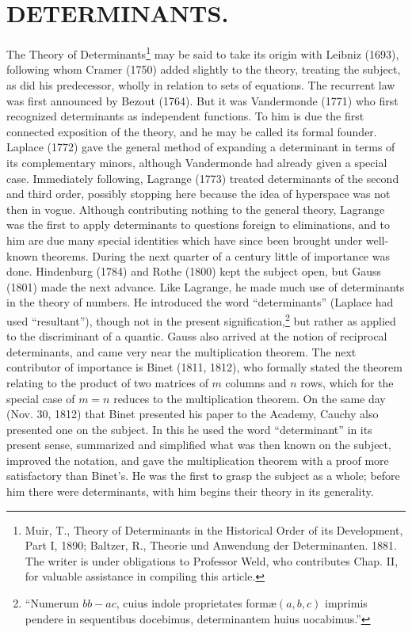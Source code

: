 \documentclass[oneside]{book}
\begin{document}
\chapter{DETERMINANTS.}

The Theory of Determinants\footnote{Muir, T., Theory of Determinants
in the Historical Order of its Development, Part I, 1890; Baltzer,
R., Theorie und Anwendung der Determinanten. 1881. The writer is
under obligations to Professor Weld, who contributes Chap. II, for
valuable assistance in compiling this article.} may be said to take
its origin with Leibniz (1693), following whom Cramer (1750) added
slightly to the theory, treating the subject, as did his
predecessor, wholly in relation to sets of equations. The recurrent
law was first announced by Bezout (1764). But it was Vandermonde
(1771) who first recognized determinants as independent
functions. To him is due the first connected exposition of the
theory, and he may be called its formal founder. Laplace (1772)
gave the general method of expanding a determinant in terms of its
complementary minors, although Vandermonde had already given a
special case. Immediately following, Lagrange (1773) treated
determinants of the second and third order, possibly stopping here
because the idea of hyperspace was not then in vogue. Although
contributing nothing to the general theory, Lagrange was the first
to apply determinants to questions foreign to eliminations, and to
him are due many special identities which have since been brought
under well-known theorems. During the next quarter of a century
little of importance was done. Hindenburg (1784) and Rothe (1800)
kept the subject open, but Gauss (1801) made the next advance. Like
Lagrange, he made much use of determinants in the theory of
numbers. He introduced the word ``determinants'' (Laplace had used
``resultant''), though not in the present
signification,\footnote{``Numerum $bb-ac$, cuius indole
proprietates form\ae $(a, b, c)$ imprimis pendere in sequentibus
docebimus, determinantem huius uocabimus.''} but
rather as applied to the discriminant of a
quantic. Gauss also arrived at the notion of reciprocal
determinants, and came very near the multiplication theorem. The
next contributor of importance is Binet (1811, 1812), who formally
stated the theorem relating to the product of two matrices of $m$
columns and $n$ rows, which for the special case of $m = n$ reduces
to the multiplication theorem. On the same day (Nov. 30, 1812) that
Binet presented his paper to the Academy, Cauchy also presented one
on the subject. In this he used the word ``determinant'' in its
present sense, summarized and simplified what was then known on the
subject, improved the notation, and gave the multiplication theorem
with a proof more satisfactory than Binet's. He was the first to
grasp the subject as a whole; before him there were determinants,
with him begins their theory in its generality.
\end{document}
